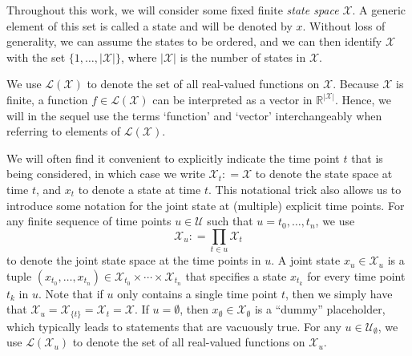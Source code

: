 \documentclass[10pt,a4paper]{paper}
\theoremstyle{definition}
\newcommand{\reals}{\mathbb{R}}
\newcommand{\states}{\mathcal{X}}
\newcommand{\gambles}{\mathcal{L}}
\newcommand{\gamblesX}{\gambles(\states)}
\newcommand{\abs}[1]{\left\vert #1 \right\vert}
\newcommand{\coloneqq}{:\!=}
\begin{document}
Throughout this work, we will consider some fixed finite \emph{state space} $\states$. A generic element of this set is called a state and will be denoted by $x$. Without loss of generality, we can assume the states to be ordered, and we can then identify $\states$ with the set $\{1,\dots,\abs{\states}\}$, where $\abs{\states}$ is the number of states in $\states$.

We use $\gamblesX$ to denote the set of all real-valued functions on $\states$. Because $\states$ is finite, a function $f\in\gamblesX$ can be interpreted as a vector in $\reals^{\abs{\states}}$. Hence, we will in the sequel use the terms `function' and `vector' interchangeably when referring to elements of $\gamblesX$.

We will often find it convenient to explicitly indicate the time point $t$ that is being considered, in which case we write $\states_t\coloneqq\states$ to denote the state space at time $t$, and $x_t$ to denote a state at time $t$. This notational trick also allows us to introduce some notation for the joint state at (multiple) explicit time points. For any finite sequence of time points $u\in\mathcal{U}$ such that $u=t_0,\ldots,t_n$, we use
\begin{equation*}
\states_u \coloneqq \prod_{t\in u}\states_t
\end{equation*}
to denote the joint state space at the time points in $u$. A joint state $x_u\in\states_u$ is a tuple $(x_{t_0},\ldots,x_{t_n})\in\states_{t_0}\times\cdots\times\states_{t_n}$ that specifies a state $x_{t_k}$ for every time point $t_k$ in $u$. Note that if $u$ only contains a single time point $t$, then we simply have that $\states_u=\states_{\{t\}}=\states_t=\states$. If $u=\emptyset$, then $x_\emptyset\in\states_\emptyset$ is a ``dummy'' placeholder, which typically leads to statements that are vacuously true. 
For any $u\in\mathcal{U}_\emptyset$, we use $\gambles(\states_u)$ to denote the set of all real-valued functions on $\states_u$. 

\end{document}
